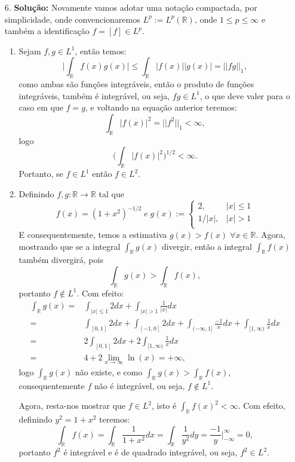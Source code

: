\documentclass{article}
\begin{document}
\begin{enumerate}
		\item[6.] \textbf{Solução:} Novamente vamos adotar uma notação compactada, por simplicidade, onde convencionaremos $L^{p} := L^{p}(\mathbb{R})$, onde $1 \leq p \leq \infty$ e também a identificação $f = [f] \in L^{p}$.
			\begin{enumerate}
				\item Sejam $f, g \in L^{1}$, então temos:
				$$
				\Big| \int_{\mathbb{R}}f(x)g(x) \Big| \leq  \int_{\mathbb{R}}|f(x)||g(x)| = ||fg||_{1},
				$$
				como ambas são funções integráveis, então o produto de funções integráveis, também é integrável, ou seja, $fg \in L^{1}$, o que deve valer para o caso em que $f=g$, e voltando na equação anterior teremos:
				$$
				\int_{\mathbb{R}}|f(x)|^{2} = ||f^{2}||_{1} < \infty,
				$$
				logo
				$$
				\Big( \int_{\mathbb{R}}|f(x)|^{2} \Big)^{1/2}  < \infty.
				$$
				Portanto, se $f \in L^{1}$ então $f \in L^{2}$.
				
				\item Definindo $f, g:\mathbb{R} \to \mathbb{R} $ tal que 
				$$
				f(x) = (1+x^{2})^{-1/2} \; e \;
				g(x) := \left\{
				\begin{array}{cc}
				2, & |x| \leq 1 \\
				1/|x|, & |x| > 1 \\
				\end{array}
				\right.
				$$
				E consequentemente, temos a estimativa $g(x) > f(x) \; \forall x \in \mathbb{R}$. Agora, mostrando que se a integral $\int_{\mathbb{R}}g(x)$ divergir, então a integral $\int_{\mathbb{R}}f(x)$ também divergirá, pois
				$$
				\int_{\mathbb{R}}g(x) > \int_{\mathbb{R}}f(x),
				$$
				portanto $f \notin L^{1}$. Com efeito:
				$$
				\begin{aligned}
				\int_{\mathbb{R}}g(x) 
				= & \int_{|x| \leq 1} 2 dx + \int_{|x| > 1} \frac{1}{|x|} dx \\
				= & \int_{[0,1]} 2 dx + \int_{[-1,0]} 2 dx + \int_{(-\infty, 1]}\frac{-1}{x}dx + \int_{[1, \infty)}\frac{1}{x}dx \\
				= & 2\int_{[0,1]} 2 dx +  2\int_{[1, \infty)}\frac{1}{x}dx \\
				= & 4 + 2 \lim_{x \to \infty} \ln(x) = +\infty,  
				\end{aligned}
				$$
				logo 
				$\int_{\mathbb{R}}g(x)$ não existe, e como $\int_{\mathbb{R}}g(x)> \int_{\mathbb{R}}f(x)$, consequentemente $f$ não é integrável, ou seja, $f \notin L^{1}$.
				
				Agora, resta-nos mostrar que $f \in L^{2}$, isto é $\int_{\mathbb{R}}f(x)^{2} <\infty$. Com efeito, definindo $y^{2} = 1+x^{2}$ teremos:
				$$
				\int_{\mathbb{R}}f(x) 
				= \int_{\mathbb{R}}\frac{1}{1+x^{2}}dx = \int_{\mathbb{R}}\frac{1}{y^{2}}dy = \frac{ -1}{y} \Big|^{\infty}_{-\infty} = 0,
				$$
				portanto $f^{2}$ é integrável e é de quadrado integrável, ou seja, $f^{2} \in L^{2}$.
				

\end{enumerate}
\end{enumerate}
\end{document}
